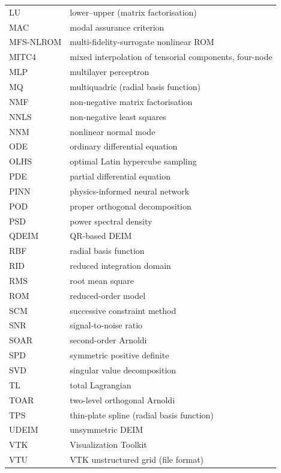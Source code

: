\begin{longtable}{@{}p{}p{}@{}}
LU & lower--upper (matrix factorisation)\\
MAC & modal assurance criterion\\
MFS-NLROM & multi-fidelity-surrogate nonlinear ROM\\
MITC4 & mixed interpolation of tensorial components, four-node\\
MLP & multilayer perceptron\\
MQ & multiquadric (radial basis function)\\
NMF & non-negative matrix factorisation\\
NNLS & non-negative least squares\\
NNM & nonlinear normal mode\\
ODE & ordinary differential equation\\
OLHS & optimal Latin hypercube sampling\\
PDE & partial differential equation\\
PINN & physics-informed neural network\\
POD & proper orthogonal decomposition\\
PSD & power spectral density\\
QDEIM & QR-based DEIM\\
RBF & radial basis function\\
RID & reduced integration domain\\
RMS & root mean square\\
ROM & reduced-order model\\
SCM & successive constraint method\\
SNR & signal-to-noise ratio\\
SOAR & second-order Arnoldi\\
SPD & symmetric positive definite\\
SVD & singular value decomposition\\
TL & total Lagrangian\\
TOAR & two-level orthogonal Arnoldi\\
TPS & thin-plate spline (radial basis function)\\
UDEIM & unsymmetric DEIM\\
VTK & Visualization Toolkit\\
VTU & VTK unstructured grid (file format)\\
\bottomrule
\end{longtable}
\endgroup
